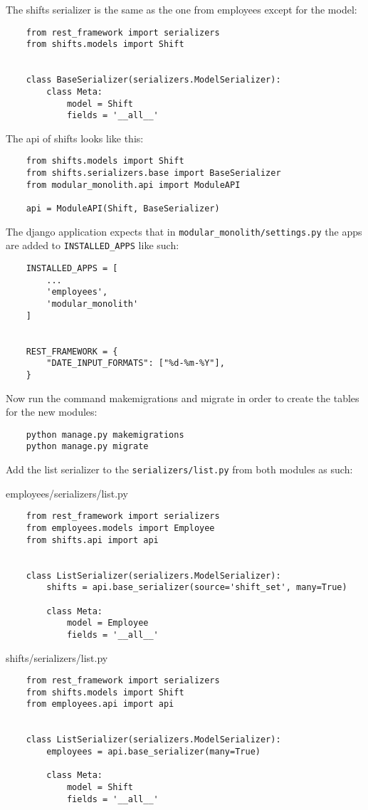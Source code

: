 The shifts serializer is the same as the one from employees except for the model:
\begin{verbatim}
    from rest_framework import serializers
    from shifts.models import Shift


    class BaseSerializer(serializers.ModelSerializer):
        class Meta:
            model = Shift
            fields = '__all__'
\end{verbatim}

The api of shifts looks like this:
\begin{verbatim}
    from shifts.models import Shift
    from shifts.serializers.base import BaseSerializer
    from modular_monolith.api import ModuleAPI

    api = ModuleAPI(Shift, BaseSerializer)
\end{verbatim}

The django application expects that in \texttt{modular\_monolith/settings.py} the apps are added to \texttt{INSTALLED\_APPS} like such:
\begin{verbatim}
    INSTALLED_APPS = [
        ...
        'employees',
        'modular_monolith'
    ]

    
    REST_FRAMEWORK = {
        "DATE_INPUT_FORMATS": ["%d-%m-%Y"],
    }
\end{verbatim}

Now run the command makemigrations and migrate in order to create the tables for the new modules:
\begin{verbatim}
    python manage.py makemigrations
    python manage.py migrate
\end{verbatim}

Add the list serializer to the \texttt{serializers/list.py} from both modules as such:

employees/serializers/list.py
\begin{verbatim}
    from rest_framework import serializers
    from employees.models import Employee
    from shifts.api import api
    
    
    class ListSerializer(serializers.ModelSerializer):
        shifts = api.base_serializer(source='shift_set', many=True)
    
        class Meta:
            model = Employee
            fields = '__all__'
\end{verbatim}

shifts/serializers/list.py
\begin{verbatim}
    from rest_framework import serializers
    from shifts.models import Shift
    from employees.api import api
    
    
    class ListSerializer(serializers.ModelSerializer):
        employees = api.base_serializer(many=True)
    
        class Meta:
            model = Shift
            fields = '__all__'  
\end{verbatim}

